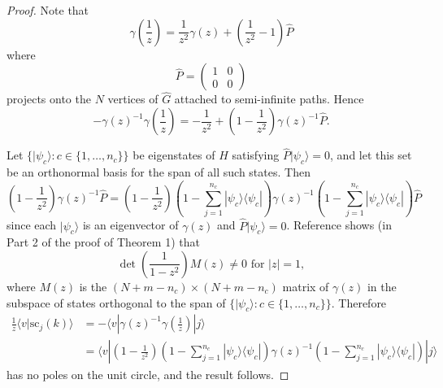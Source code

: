 \documentclass[../thesis-main/thesis-main]{subfiles}
\begin{document}
\begin{proof}
Note that 
\begin{equation}
\gamma\left(\frac{1}{z}\right)=\frac{1}{z^{2}}\gamma(z)+\left(\frac{1}{z^{2}}-1\right)\widehat{P}\end{equation}
where 
\begin{equation}
\widehat{P}=\begin{pmatrix}
1 & 0\\
0 & 0\end{pmatrix}
\end{equation}
projects onto the $N$ vertices of $\widehat{G}$ attached to semi-infinite paths. Hence 
\begin{equation}
-\gamma(z)^{-1}\gamma\left(\frac{1}{z}\right)=-\frac{1}{z^{2}}+\left(1-\frac{1}{z^{2}}\right)\gamma(z)^{-1}\widehat{P}.
\end{equation}

Let $\{|\psi_{c}\rangle \colon c\in\{1,\ldots,n_{c}\}\}$ be eigenstates of $\widehat{H}$ satisfying $\widehat{P}|\psi_c\rangle=0$, and let this set be an orthonormal basis for the span of all such states. Then
 \begin{equation}
\left(1-\frac{1}{z^{2}}\right)\gamma(z)^{-1}\widehat{P}=\left(1-\frac{1}{z^{2}}\right)\left(1-\sum_{j=1}^{n_{c}}|\psi_{c}\rangle\langle\psi_{c}|\right)\gamma(z)^{-1}\left(1-\sum_{j=1}^{n_{c}}|\psi_{c}\rangle\langle\psi_{c}|\right)\widehat{P}\end{equation}
 since each $|\psi_c\rangle$ is an eigenvector of $\gamma(z)$ and
$\widehat{P}|\psi_{c}\rangle=0$. Reference \cite{CG12} shows (in Part 2 of the proof of Theorem 1) that
\begin{equation}
\det\left(\frac{1}{1-z^{2}}\right)M(z)\neq0\text{ for }|z|=1,
\end{equation}
where $M(z)$ is the $(N+m-n_{c})\times(N+m-n_{c})$ matrix of $\gamma(z)$ in the subspace of states orthogonal to the span of $\{|\psi_{c}\rangle \colon c\in\{1,\ldots,n_{c}\}\}$. Therefore 
\begin{align*}
\frac{1}{z}\langle v|\mathrm{sc}_{j}(k)\rangle & =  -\langle v|\gamma(z)^{-1}\gamma\left(\frac{1}{z}\right)|j\rangle\\
 & = \langle v|\left(1-\frac{1}{z^{2}}\right)\left(1-\sum_{j=1}^{n_{c}}|\psi_{c}\rangle\langle\psi_{c}|\right)\gamma(z)^{-1}\left(1-\sum_{j=1}^{n_{c}}|\psi_{c}\rangle\langle\psi_{c}|\right)|j\rangle
\end{align*}
has no poles on the unit circle, and the result follows.

\end{proof}
\end{document}
